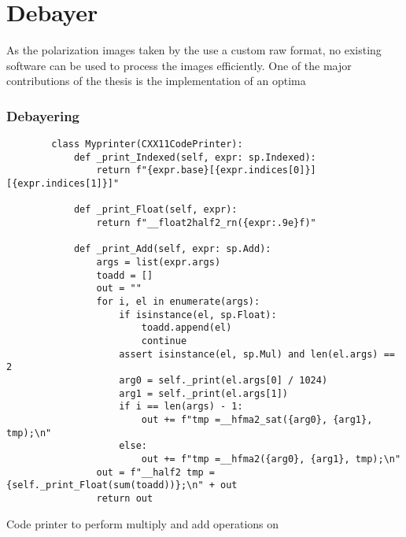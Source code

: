 
\chapter{Debayer}
As the polarization images taken by the \cams use a custom raw format, no existing software can be used to process the images efficiently.
One of the major contributions of the thesis is the implementation of an optima








\subsection{Debayering}
\cite{getreuerMalvarHeCutlerLinearImage2011}

\begin{listing}[H]
    \begin{verbatim}
        class Myprinter(CXX11CodePrinter):
            def _print_Indexed(self, expr: sp.Indexed):
                return f"{expr.base}[{expr.indices[0]}][{expr.indices[1]}]"

            def _print_Float(self, expr):
                return f"__float2half2_rn({expr:.9e}f)"

            def _print_Add(self, expr: sp.Add):
                args = list(expr.args)
                toadd = []
                out = ""
                for i, el in enumerate(args):
                    if isinstance(el, sp.Float):
                        toadd.append(el)
                        continue
                    assert isinstance(el, sp.Mul) and len(el.args) == 2
                    arg0 = self._print(el.args[0] / 1024)
                    arg1 = self._print(el.args[1])
                    if i == len(args) - 1:
                        out += f"tmp =__hfma2_sat({arg0}, {arg1}, tmp);\n"
                    else:
                        out += f"tmp =__hfma2({arg0}, {arg1}, tmp);\n"
                out = f"__half2 tmp = {self._print_Float(sum(toadd))};\n" + out
                return out
        \end{verbatim}
    \caption{Code printer to perform multiply and add operations on \halftwo}
\end{listing}

